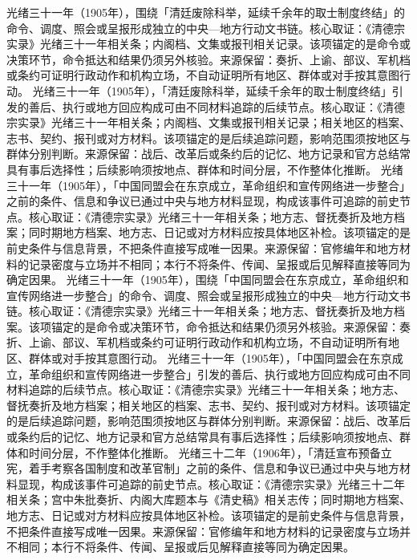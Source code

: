 光绪三十一年（1905年），围绕「清廷废除科举，延续千余年的取士制度终结」的命令、调度、照会或呈报形成独立的中央—地方行动文书链。核心取证：《清德宗实录》光绪三十一年相关条；内阁档、文集或报刊相关记录。该项锚定的是命令或决策环节，命令抵达和结果仍须另外核验。来源保留：奏折、上谕、部议、军机档或条约可证明行政动作和机构立场，不自动证明所有地区、群体或对手按其意图行动。
光绪三十一年（1905年），「清廷废除科举，延续千余年的取士制度终结」引发的善后、执行或地方回应构成可由不同材料追踪的后续节点。核心取证：《清德宗实录》光绪三十一年相关条；内阁档、文集或报刊相关记录；相关地区的档案、志书、契约、报刊或对方材料。该项锚定的是后续追踪问题，影响范围须按地区与群体分别判断。来源保留：战后、改革后或条约后的记忆、地方记录和官方总结常具有事后选择性；后续影响须按地点、群体和时间分层，不作整体化推断。
光绪三十一年（1905年），「中国同盟会在东京成立，革命组织和宣传网络进一步整合」之前的条件、信息和争议已通过中央与地方材料显现，构成该事件可追踪的前史节点。核心取证：《清德宗实录》光绪三十一年相关条；地方志、督抚奏折及地方档案；同时期地方档案、地方志、日记或对方材料应按具体地区补检。该项锚定的是前史条件与信息背景，不把条件直接写成唯一因果。来源保留：官修编年和地方材料的记录密度与立场并不相同；本行不将条件、传闻、呈报或后见解释直接等同为确定因果。
光绪三十一年（1905年），围绕「中国同盟会在东京成立，革命组织和宣传网络进一步整合」的命令、调度、照会或呈报形成独立的中央—地方行动文书链。核心取证：《清德宗实录》光绪三十一年相关条；地方志、督抚奏折及地方档案。该项锚定的是命令或决策环节，命令抵达和结果仍须另外核验。来源保留：奏折、上谕、部议、军机档或条约可证明行政动作和机构立场，不自动证明所有地区、群体或对手按其意图行动。
光绪三十一年（1905年），「中国同盟会在东京成立，革命组织和宣传网络进一步整合」引发的善后、执行或地方回应构成可由不同材料追踪的后续节点。核心取证：《清德宗实录》光绪三十一年相关条；地方志、督抚奏折及地方档案；相关地区的档案、志书、契约、报刊或对方材料。该项锚定的是后续追踪问题，影响范围须按地区与群体分别判断。来源保留：战后、改革后或条约后的记忆、地方记录和官方总结常具有事后选择性；后续影响须按地点、群体和时间分层，不作整体化推断。
光绪三十二年（1906年），「清廷宣布预备立宪，着手考察各国制度和改革官制」之前的条件、信息和争议已通过中央与地方材料显现，构成该事件可追踪的前史节点。核心取证：《清德宗实录》光绪三十二年相关条；宫中朱批奏折、内阁大库题本与《清史稿》相关志传；同时期地方档案、地方志、日记或对方材料应按具体地区补检。该项锚定的是前史条件与信息背景，不把条件直接写成唯一因果。来源保留：官修编年和地方材料的记录密度与立场并不相同；本行不将条件、传闻、呈报或后见解释直接等同为确定因果。
